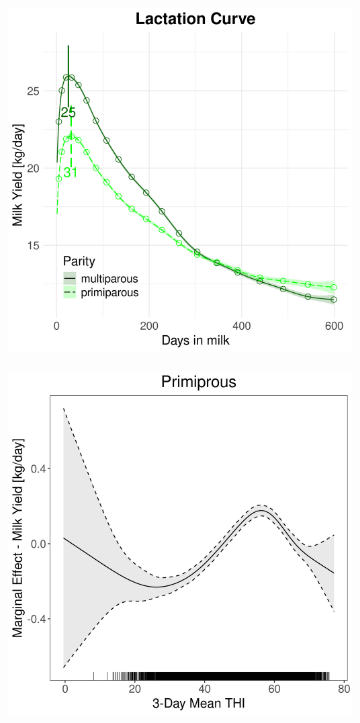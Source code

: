 \begin{figure}[H]
\begin{subfigure}[b]{0.45\textwidth}
        \includegraphics[width=\textwidth]{thesis/figures/models/milk/full/je_milk_full/je_milk_full_marginal_dim_milk_combined.png}
    \end{subfigure}
    \begin{subfigure}[b]{0.45\textwidth}
        \centering
        \includegraphics[width=\textwidth]{thesis/figures/models/milk/full/je_milk_full/je_milk_full_marginal_thi_milk_primi.png}

\end{subfigure}
\end{figure}
